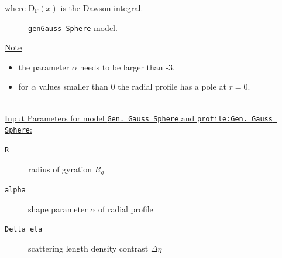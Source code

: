 where $\operatorname{D_F}(x)$ is the Dawson integral.
\begin{figure}[htb]
\captionsetup[subfigure]{position=b}
\centering
{}
\hfill
{}
\caption{\texttt{genGauss Sphere}-model.}
\label{fig:genGaussprofile}
\end{figure}

\noindent
\uline{Note}
\begin{itemize}
  \item the parameter $\alpha$ needs to be larger than -3.
  \item for $\alpha$ values smaller than 0 the radial profile has a pole at $r=0$.
\end{itemize}

\hspace{1pt}\\
\uline{Input Parameters for model \texttt{Gen. Gauss Sphere} and \texttt{profile:Gen. Gauss  Sphere}:}
\begin{description}
\item[\texttt{R}] radius of gyration $R_g$
\item[\texttt{alpha}] shape parameter $\alpha$ of radial profile
\item[\texttt{Delta\_eta}] scattering length density contrast $\Delta\eta$
\end{description} 
